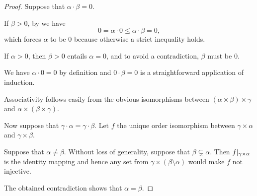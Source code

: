 \begin{proof}
   Suppose that \( \alpha \cdot \beta = 0 \).

  If \( \beta > 0 \), by  we have
  \begin{equation*}
    0 = \alpha \cdot 0 \leq \alpha \cdot \beta = 0,
  \end{equation*}
  which forces \( \alpha \) to be \( 0 \) because otherwise a strict inequality holds.

  If \( \alpha > 0 \), then \( \beta > 0 \) entails \( \alpha = 0 \), and to avoid a contradiction, \( \beta \) must be \( 0 \).

   We have \( \alpha \cdot 0 = 0 \) by definition and \( 0 \cdot \beta = 0 \) is a straightforward application of induction.

   Associativity follows easily from the obvious isomorphisms between \( (\alpha \times \beta) \times \gamma \) and \( \alpha \times (\beta \times \gamma) \).

   Now suppose that \( \gamma \cdot \alpha = \gamma \cdot \beta \). Let \( f \) the unique order isomorphism between \( \gamma \times \alpha \) and \( \gamma \times \beta \).

  Suppose that \( \alpha \neq \beta \). Without loss of generality, suppose that \( \beta \subsetneq \alpha \). Then \( f\vert_{\gamma \times \alpha} \) is the identity mapping and hence any set from \( \gamma \times (\beta \setminus \alpha) \) would make \( f \) not injective.

  The obtained contradiction shows that \( \alpha = \beta \).
\end{proof}

